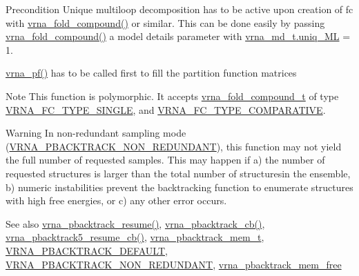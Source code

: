 \begin{DoxyPrecond}{Precondition}
Unique multiloop decomposition has to be active upon creation of {\ttfamily fc} with \mbox{\hyperlink{group__fold__compound_ga6601d994ba32b11511b36f68b08403be}{vrna\+\_\+fold\+\_\+compound()}} or similar. This can be done easily by passing \mbox{\hyperlink{group__fold__compound_ga6601d994ba32b11511b36f68b08403be}{vrna\+\_\+fold\+\_\+compound()}} a model details parameter with \mbox{\hyperlink{group__model__details_ade065b814a4e2e72ead93ab502613ed2}{vrna\+\_\+md\+\_\+t.\+uniq\+\_\+\+ML}} = 1. 

\mbox{\hyperlink{group__part__func__global_ga29e256d688ad221b78d37f427e0e99bc}{vrna\+\_\+pf()}} has to be called first to fill the partition function matrices
\end{DoxyPrecond}
\begin{DoxyNote}{Note}
This function is polymorphic. It accepts \mbox{\hyperlink{group__fold__compound_ga1b0cef17fd40466cef5968eaeeff6166}{vrna\+\_\+fold\+\_\+compound\+\_\+t}} of type \mbox{\hyperlink{group__fold__compound_gga01a4ff86fa71deaaa5d1abbd95a1447da7e264dd3cf2dc9b6448caabcb7763cd6}{V\+R\+N\+A\+\_\+\+F\+C\+\_\+\+T\+Y\+P\+E\+\_\+\+S\+I\+N\+G\+LE}}, and \mbox{\hyperlink{group__fold__compound_gga01a4ff86fa71deaaa5d1abbd95a1447dab821ce46ea3cf665be97df22a76f5023}{V\+R\+N\+A\+\_\+\+F\+C\+\_\+\+T\+Y\+P\+E\+\_\+\+C\+O\+M\+P\+A\+R\+A\+T\+I\+VE}}.
\end{DoxyNote}
\begin{DoxyWarning}{Warning}
In non-\/redundant sampling mode (\mbox{\hyperlink{group__subopt__stochbt_ga9d580ce645aa0c38b69afdf56c332200}{V\+R\+N\+A\+\_\+\+P\+B\+A\+C\+K\+T\+R\+A\+C\+K\+\_\+\+N\+O\+N\+\_\+\+R\+E\+D\+U\+N\+D\+A\+NT}}), this function may not yield the full number of requested samples. This may happen if a) the number of requested structures is larger than the total number of structuresin the ensemble, b) numeric instabilities prevent the backtracking function to enumerate structures with high free energies, or c) any other error occurs.
\end{DoxyWarning}
\begin{DoxySeeAlso}{See also}
\mbox{\hyperlink{group__subopt__stochbt_gae175129ece546fe7c092f27072e039d1}{vrna\+\_\+pbacktrack\+\_\+resume()}}, \mbox{\hyperlink{group__subopt__stochbt_ga843fa953a15337b15cc68401adad84d7}{vrna\+\_\+pbacktrack\+\_\+cb()}}, \mbox{\hyperlink{group__subopt__stochbt_ga4a91dc092580faf7799476e8dd76e0ac}{vrna\+\_\+pbacktrack5\+\_\+resume\+\_\+cb()}}, \mbox{\hyperlink{group__subopt__stochbt_gaa59c30efbed96bf9aaf8005584c72e63}{vrna\+\_\+pbacktrack\+\_\+mem\+\_\+t}}, \mbox{\hyperlink{group__subopt__stochbt_ga760aa2fb2d5e3d7521a11454a21e9b9f}{V\+R\+N\+A\+\_\+\+P\+B\+A\+C\+K\+T\+R\+A\+C\+K\+\_\+\+D\+E\+F\+A\+U\+LT}}, \mbox{\hyperlink{group__subopt__stochbt_ga9d580ce645aa0c38b69afdf56c332200}{V\+R\+N\+A\+\_\+\+P\+B\+A\+C\+K\+T\+R\+A\+C\+K\+\_\+\+N\+O\+N\+\_\+\+R\+E\+D\+U\+N\+D\+A\+NT}}, \mbox{\hyperlink{group__subopt__stochbt_gae64fbdef59e7f503d7e920aac279212b}{vrna\+\_\+pbacktrack\+\_\+mem\+\_\+free}}
\end{DoxySeeAlso}

